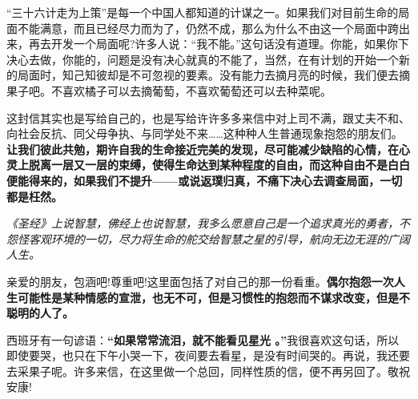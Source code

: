 \documentclass[UTF8,a4paper,8pt]{ctexart}
\begin{document}
 “三十六计走为上策”是每一个中国人都知道的计谋之一。如果我们对目前生命的局面不能满意，而且已经尽力而为了，仍然不成，那么为什么不由这一个局面中跨出来，再去开发一个局面呢?许多人说：“我不能。”这句话没有道理。你能，如果你下决心去做，你能的，问题是没有决心就真的不能了，当然，在有计划的开始一个新的局面时，知己知彼却是不可忽视的要素。没有能力去摘月亮的时候，我们便去摘果子吧。不喜欢橘子可以去摘葡萄，不喜欢葡萄还可以去种菜呢。
 
 这封信其实也是写给自己的，也是写给许许多多来信中对上司不满，跟丈夫不和、向社会反抗、同父母争执、与同学处不来……这种种人生普通现象抱怨的朋友们。\textbf{让我们彼此共勉，期许自我的生命接近完美的发现，尽可能减少缺陷的心情，在心灵上脱离一层又一层的束缚，使得生命达到某种程度的自由，而这种自由不是白白便能得来的，如果我们不提升——或说返璞归真，不痛下决心去调查局面，一切都是枉然。}
 
 \textit{《圣经》上说智慧，佛经上也说智慧，我多么愿意自己是一个追求真光的勇者，不怨怪客观环境的一切，尽力将生命的舵交给智慧之星的引导，航向无边无涯的广阔人生。}
 
 亲爱的朋友，包涵吧!尊重吧!这里面包括了对自己的那一份看重。\textbf{偶尔抱怨一次人生可能性是某种情感的宣泄，也无不可，但是习惯性的抱怨而不谋求改变，但是不聪明的人了。}
 
 西班牙有一句谚语：\textbf{“如果常常流泪，就不能看见星光 。”}我很喜欢这句话，所以即使要哭，也只在下午小哭一下，夜间要去看星，是没有时间哭的。再说，我还要去采果子呢。许多来信，在这里做一个总回，同样性质的信，便不再另回了。敬祝  安康!	 
 
 
 \newpage
\end{document}
